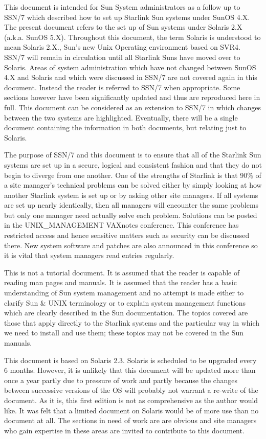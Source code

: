 This document is intended for Sun System administrators
as a follow up to SSN/7 which described how to set up
Starlink Sun systems under SunOS 4.X. The present document refers to the set up
of Sun systems under Solaris 2.X (a.k.a. SunOS 5.X). Throughout this document,
the term Solaris is understood to mean Solaris 2.X., Sun's new Unix Operating
environment based on SVR4. SSN/7 will remain in circulation
until all Starlink Suns have moved over to Solaris. Areas of system
administration which have not changed  between SunOS 4.X and Solaris and which
were discussed in SSN/7 are not covered again in this document. Instead the
reader is referred to SSN/7 when appropriate. Some sections however have been
significantly updated and thus are reproduced here in full.  This document can
be considered as an  extension to SSN/7 in which changes between the two
systems are highlighted. Eventually, there will be a single document containing
the information in both documents, but relating just to Solaris.

The purpose of SSN/7 and this document is to ensure that all of the Starlink
Sun systems are set up in a secure, logical and consistent fashion and that
they do not begin to diverge from one another. One of the strengths of Starlink
is that 90\% of a site manager's technical problems can be solved either by
simply looking at how another Starlink system is set up or by asking other site
managers. If all systems are set up nearly identically, then all managers will
encounter the same problems but only one manager need actually solve each
problem. Solutions can be posted in the UNIX\_MANAGEMENT VAXnotes
conference. This conference has restricted access and hence sensitive matters
such as security can be discussed there. New system software and patches are
also announced in this conference so it is vital that system managers read
entries regularly.

This is not a tutorial document. It is assumed that the reader is capable of
reading man pages and manuals.  It is assumed that the reader has a basic
understanding of Sun system management and no attempt is made either to clarify
Sun \& UNIX terminology or to explain system
management functions which are clearly described in the Sun documentation. The
topics covered are those that apply directly to the Starlink systems and the
particular way in which we need to install and use them; these topics may not
be covered in the Sun manuals.

This document is based on Solaris 2.3. Solaris is scheduled to be upgraded
every 6 months. However, it is unlikely that this document will be updated more
than once a year partly due to pressure of work and partly because the changes
between successive versions of the OS will probably not warrant a re-write of
the document. As it is, this first edition is not as comprehensive as the
author would like. It was felt that a limited document on Solaris would be of
more use than no document at all. The sections in need of work are are obvious
and site managers who gain expertise in these areas are invited to contribute
to this document.

